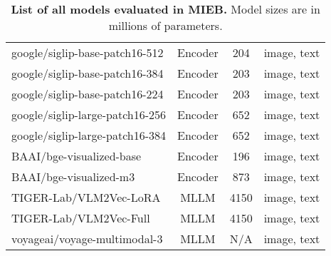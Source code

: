 \begin{table*}
{\begin{tabular}{lccc}
google/siglip-base-patch16-512 \cite{zhai2023sigmoid} & Encoder & 204 & image, text \\ 
google/siglip-base-patch16-384 \cite{zhai2023sigmoid} & Encoder & 203 & image, text \\ 
google/siglip-base-patch16-224 \cite{zhai2023sigmoid} & Encoder & 203 & image, text \\ 
google/siglip-large-patch16-256 \cite{zhai2023sigmoid} & Encoder & 652 & image, text \\ 
google/siglip-large-patch16-384 \cite{zhai2023sigmoid} & Encoder & 652 & image, text \\ 
BAAI/bge-visualized-base \cite{zhou2024vista} & Encoder & 196 & image, text \\ 
BAAI/bge-visualized-m3 \cite{zhou2024vista} & Encoder & 873 & image, text \\ 
TIGER-Lab/VLM2Vec-LoRA \cite{jiang2024vlm2vec} & MLLM & 4150 & image, text \\ 
TIGER-Lab/VLM2Vec-Full \cite{jiang2024vlm2vec} & MLLM & 4150 & image, text \\ 
voyageai/voyage-multimodal-3 \cite{voyagemultimodal2024voyage} & MLLM & N/A & image, text \\ 
\bottomrule
\end{tabular}}
\caption{\textbf{List of all models evaluated in MIEB.} Model sizes are in millions of parameters.}\label{tab: list of models}
\end{table*}